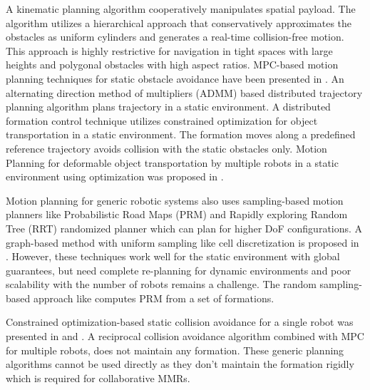 A kinematic planning algorithm \cite{2019_Tallamraju} cooperatively manipulates spatial payload. The algorithm utilizes a hierarchical approach that conservatively approximates the obstacles as uniform cylinders and generates a real-time collision-free motion. This approach is highly restrictive for navigation in tight spaces with large heights and polygonal obstacles with high aspect ratios. MPC-based motion planning techniques for static obstacle avoidance have been presented in \cite{2017_Nikou,2024_Kennel}. An alternating direction method of multipliers (ADMM) based distributed trajectory planning algorithm \cite{2020_Shorinwa} plans trajectory in a static environment. A distributed formation control technique \cite{2021_Wu} utilizes constrained optimization for object transportation in a static environment. The formation moves along a predefined reference trajectory avoids collision with the static obstacles only. Motion Planning for deformable object transportation by multiple robots in a static environment using optimization was proposed in \cite{2022_Hu,2024_Pei}.

Motion planning for generic robotic systems also uses sampling-based motion planners like Probabilistic Road Maps (PRM) \cite{1996_Kavraki} and Rapidly exploring Random Tree (RRT) \cite{1998_Lavalle,2001_Lavalle,2019_Kleinbort} randomized planner which can plan for higher DoF configurations. A graph-based method with uniform sampling like cell discretization is proposed in \cite{2024_Liu}. However, these techniques work well for the static environment with global guarantees, but need complete re-planning for dynamic environments and poor scalability with the number of robots remains a challenge. The random sampling-based approach like \cite{2012_Krontiris} computes PRM from a set of formations. 

Constrained optimization-based static collision avoidance for a single robot was presented in \cite{2021_Zhang} and \cite{2016_Faulwasser}. A reciprocal collision avoidance algorithm \cite{2020_Mao} combined with MPC for multiple robots, does not maintain any formation. These generic planning algorithms cannot be used directly as they don't maintain the formation rigidly which is required for collaborative MMRs.
